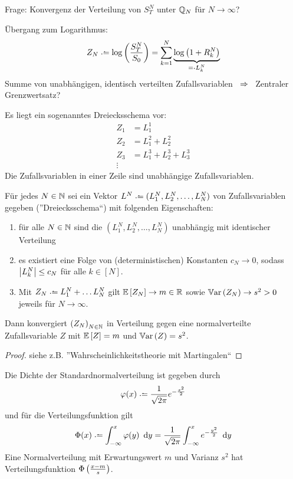 Frage: Konvergenz der Verteilung von $S_T^N$ unter $\Q_N$ für $N \to \infty$?

Übergang zum Logarithmus:
\begin{equation*}
Z_N \defeq \log\brackets{\frac{S_T^N}{S_0}} = \sum_{k = 1}^N \underbrace{\log\brackets{1 + R_k^N}}_{\defqe L_k^N}
\end{equation*}
Summe von unabhängigen, identisch verteilten Zufallsvariablen $\follows$ Zentraler Grenzwertsatz?

Es liegt ein sogenanntes Dreiecksschema vor:
\begin{align*}
	Z_1 &= L_1^1 \\
	Z_2 &= L_1^2 + L_2^2 \\
	Z_3 &= L_1^3 + L_2^3 + L_3^3 \\
	\vdots&
\end{align*}
Die Zufallsvariablen in einer Zeile sind unabhängige Zufallsvariablen.

\begin{theorem} %
	\label{theorem: 3.1} 
	Für jedes $N \in \N$ sei ein Vektor \newline
	$L^N \defeq (L_1^N, L_2^N, \dots, L_N^N)$ von Zufallsvariablen gegeben (''Dreiecksschema``) mit folgenden Eigenschaften:
	\begin{enumerate}[label = (\alph*)]
		\item für alle $N \in \N$ sind die $(L_1^N, L_2^N, \dots, L_N^N)$ unabhängig mit identischer Verteilung
		\item es existiert eine Folge von (deterministischen) Konstanten $c_N \to 0$, sodass $\abs{L_k^N} \le c_N$ für alle $k \in [N]$.
		\item Mit $Z_N \defeq L_1^N + \dots L_N^N$ gilt $\EW[Z_N] \to m \in \R$ sowie $\Var[Z_N] \to s^2 > 0$ jeweils für $N \to \infty$.
	\end{enumerate}
	Dann konvergiert $\folge{Z_N}{N \in \N}$ in Verteilung gegen eine normalverteilte Zufallsvariable $Z$ mit $\EW[Z] = m$ und $\Var[Z] = s^2$. 
\end{theorem}
\begin{proof}
	siehe z.B. ''Wahrscheinlichkeitstheorie mit Martingalen``
\end{proof}

\begin{*bemerkung}
	Die Dichte der Standardnormalverteilung ist gegeben durch
	\begin{equation*}
	\phi(x) \defeq \frac{1}{\sqrt{2 \pi}} e^{-\frac{x^2}{2}}
	\end{equation*}
	und für die Verteilungsfunktion gilt
	\begin{equation*}
	\Phi(x) \defeq \int_{-\infty}^x \phi(y) \diffskip{y} = \frac{1}{\sqrt{2 \pi}} \int_{-\infty}^x e^{-\frac{y^2}{2}} \diffskip{y}
	\end{equation*}
	Eine Normalverteilung mit Erwartungswert $m$ und Varianz $s^2$ hat Verteilungsfunktion $\Phi\brackets{\frac{x-m}{s}}$.
\end{*bemerkung}

